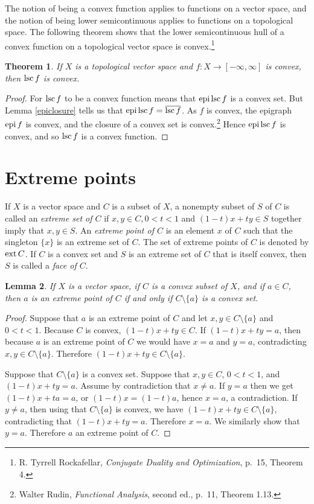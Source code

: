 \documentclass{article}
\newcommand{\epi}{\ensuremath\mathrm{epi}\,}
\newcommand{\lsc}{\ensuremath\mathrm{lsc}\,}
\newcommand{\ext}{\ensuremath\mathrm{ext}\,}
\newtheorem{theorem}{Theorem}
\newtheorem{lemma}[theorem]{Lemma}
\theoremstyle{definition}
\begin{document}
The notion of being a convex function applies to functions on a vector space, and the notion of being lower semicontinuous applies to functions
on a topological space. 
The following theorem shows  that the lower semicontinuous hull of a convex function on a topological vector space is convex.\footnote{R. Tyrrell Rockafellar, {\em Conjugate Duality and Optimization}, p.~15, Theorem 4.}

\begin{theorem}
If $X$ is a  topological vector space and  $f:X \to [-\infty,\infty]$ is convex, then $\lsc f$ is convex. 
\end{theorem}
\begin{proof}
For $\lsc f$ to be a convex function means that $\epi \lsc f$ is a convex set. But  Lemma \ref{epiclosure} tells us that
 $\epi \lsc f = \overline{\lsc f}$. As $f$ is convex, the epigraph $\epi f$ is convex, and the closure of a convex set is convex.\footnote{Walter Rudin,
 {\em Functional Analysis}, second ed., p.~11, Theorem 1.13.} Hence $\epi \lsc f$ is convex, and so $\lsc f$ is a convex function.
\end{proof}



\section{Extreme points}
If $X$ is a vector space and $C$ is a subset of $X$, a nonempty subset of $S$ of $C$ is called an {\em extreme set of $C$} if $x,y \in C, 0<t<1$ and
$(1-t)x+ty \in S$ together imply that $x,y \in S$. An {\em extreme point of $C$} is an element $x$ of $C$ such that the singleton $\{x\}$ is an extreme set of $C$.
The set of extreme points of $C$ is denoted by $\ext C$. If $C$ is a convex set and $S$ is an extreme set of $C$ that is itself convex,
then $S$ is called a {\em face of $C$}.

\begin{lemma}
If $X$ is a vector space, if $C$ is a convex subset of $X$, and if $a \in C$, then $a$ is an extreme point of $C$ if and only if $C \setminus \{a\}$
is a convex set.
\end{lemma}
\begin{proof}
Suppose that $a$ is an extreme point of $C$ and let $x,y \in C \setminus \{a\}$ and $0 < t  < 1$. 
Because $C$ is convex, $(1-t)x+ty \in C$. If $(1-t)x+ty=a$, then because $a$ is an extreme  point of $C$ we would have
$x=a$ and $y=a$, contradicting $x,y \in C \setminus \{a\}$. Therefore $(1-t)x+ty \in C \setminus \{a\}$. 

Suppose that $C \setminus \{a\}$ is a convex set. Suppose that $x,y \in C$, $0<t<1$, and   $(1-t)x+ty = a$.
Assume by contradiction that $x \neq a$. If $y=a$ then we get $(1-t)x+ta=a$, or $(1-t)x=(1-t)a$, hence $x=a$, a contradiction. If $y \neq a$, then using
that $C \setminus \{a\}$ is convex, we have $(1-t)x+ty \in C \setminus \{a\}$, contradicting that $(1-t)x+ty =a$. Therefore $x=a$. We similarly show that
$y =a$. Therefore $a$ an extreme point of $C$.
\end{proof}
\end{document}
